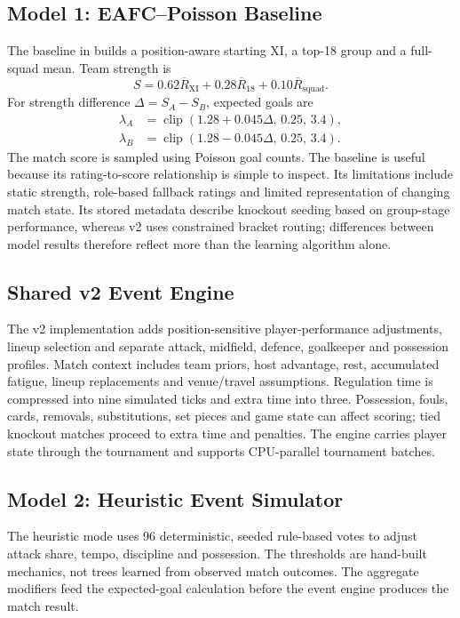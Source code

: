 \subsection{Model 1: EAFC--Poisson Baseline}
The baseline in  builds a position-aware starting
XI, a top-18 group and a full-squad mean. Team strength is
\begin{equation}
S=0.62\overline R_{\mathrm{XI}}+0.28\overline R_{18}
  +0.10\overline R_{\mathrm{squad}}.
\end{equation}
For strength difference $\Delta=S_A-S_B$, expected goals are
\begin{align}
\lambda_A&=\operatorname{clip}(1.28+0.045\Delta,\,0.25,\,3.4),\\
\lambda_B&=\operatorname{clip}(1.28-0.045\Delta,\,0.25,\,3.4).
\end{align}
The match score is sampled using Poisson goal counts. The baseline is useful
because its rating-to-score relationship is simple to inspect. Its limitations
include static strength, role-based fallback ratings and limited representation
of changing match state. Its stored metadata describe knockout seeding based on
group-stage performance, whereas v2 uses constrained bracket routing; differences
between model results therefore reflect more than the learning algorithm alone.

\subsection{Shared v2 Event Engine}
The v2 implementation adds position-sensitive player-performance adjustments,
lineup selection and separate attack, midfield, defence, goalkeeper and
possession profiles. Match context includes team priors, host advantage,
rest, accumulated fatigue, lineup replacements and venue/travel assumptions.
Regulation time is compressed into nine simulated ticks and extra time into
three. Possession, fouls, cards, removals, substitutions, set pieces and game
state can affect scoring; tied knockout matches proceed to extra time and
penalties. The engine carries player state through the tournament and supports
CPU-parallel tournament batches.
\clearpage
\subsection{Model 2: Heuristic Event Simulator}
The heuristic mode uses 96 deterministic, seeded rule-based votes to adjust
attack share, tempo, discipline and possession. The thresholds are hand-built
mechanics, not trees learned from observed match outcomes. The aggregate
modifiers feed the expected-goal calculation before the event engine produces
the match result.

